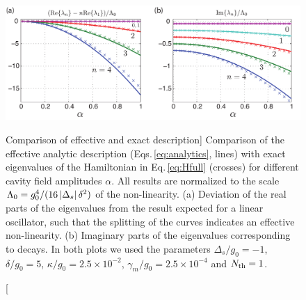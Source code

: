 \begin{figure}
\centering
\includegraphics[width=1\textwidth]{./figs_Stannigel2012/Figure_suppl.pdf}
\caption
[Comparison of effective and exact description]
{Comparison of the effective analytic description
(Eqs.\,\eqref{eq:analytics}, lines) with exact eigenvalues of the Hamiltonian in
Eq.\,\eqref{eq:Hfull} (crosses) for different cavity field amplitudes $\alpha$.
All results are normalized to the scale
$\Lambda_0=g_0^4/(16\left| \Delta_s \right|\delta^2)$ of the non-linearity.
(a) Deviation of the real parts of the eigenvalues from the result expected for
a linear oscillator, such that the splitting of the curves indicates an
effective non-linearity.
(b) Imaginary parts of the eigenvalues corresponding to decays. In both plots we
used the parameters $\Delta_s/g_0=-1$, $\delta/g_0=5$, $\kappa/g_0=2.5\times
10^{-2}$, $\gamma_m/g_0=2.5\times 10^{-4}$ and $N_{\rm th}=1$.}
\label{fig:numerics}
\end{figure}


